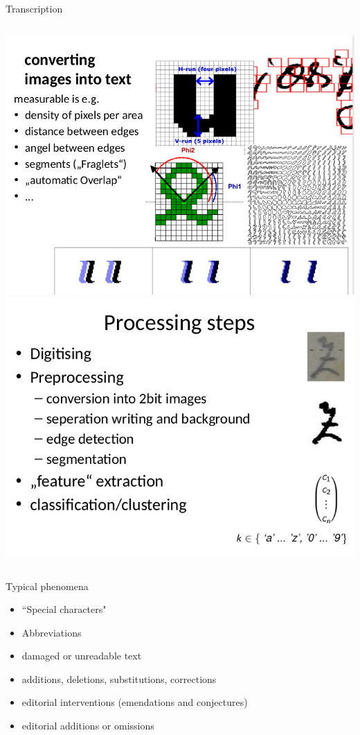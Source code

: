 \begin{frame}{Transcription}
\begin{columns}
\includegraphics[width=\textwidth]{img/ocr1.png}
\includegraphics[width=\textwidth]{img/ocr2.png}
\end{columns}

\framebreak 

\begin{columns}
\begin{block}{Typical phenomena}
\begin{itemize}
\item “Special characters"
\item Abbreviations
\item damaged or unreadable text
\item additions, deletions, substitutions, corrections
\item editorial interventions (emendations and conjectures)
\item  editorial additions or omissions
\end{itemize}
\end{block}


\end{columns}
\end{frame}
